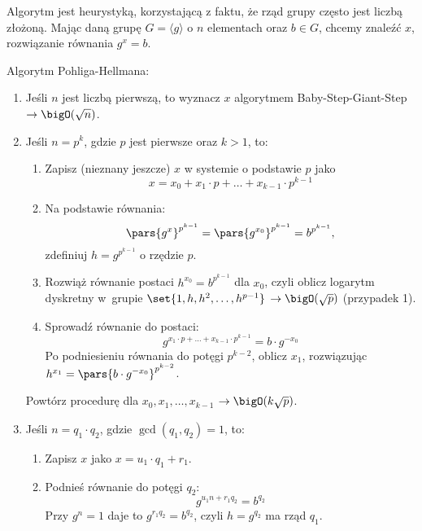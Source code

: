 Algorytm jest heurystyką, korzystającą z faktu, że rząd grupy często jest liczbą złożoną. Mając daną grupę \( G = \langle g \rangle \) o \( n \) elementach oraz \( b \in G \), chcemy znaleźć \( x \), rozwiązanie równania \( g^x = b \).
\begin{greyframe}
    Algorytm Pohliga-Hellmana:
    \begin{enumerate}
        \item Jeśli \( n \) jest liczbą pierwszą, to wyznacz \( x \) algorytmem Baby-Step-Giant-Step \\ \( \rightarrow \bigO(\sqrt{n}) \).
        \item Jeśli \( n = p^k \), gdzie \( p \) jest pierwsze oraz \( k > 1 \), to:
            \begin{enumerate}
                \item Zapisz (nieznany jeszcze) \( x \) w systemie o podstawie \( p \) jako 
                \[
                    x = x_0 + x_1 \cdot p + \ldots + x_{k-1} \cdot p^{k-1}
                \]
                \item Na podstawie równania:
                \[
                    \pars{g^x}^{p^{k-1}} = \pars{g^{x_0}}^{p^{k-1}} = b^{p^{k-1}},
                \]
                zdefiniuj \( h = g^{p^{k-1}} \) o rzędzie \( p \).
                \item Rozwiąż równanie postaci \( h^{x_0} = b^{p^{k-1}} \) dla \( x_0 \), czyli oblicz logarytm dyskretny w~grupie \( \set{1, h, h^2, \ldots, h^{p-1}} \) \( \rightarrow \bigO(\sqrt{p}) \) (przypadek 1).
                \item Sprowadź równanie do postaci: 
                \[
                    g^{x_1 \cdot p + \ldots + x_{k-1} \cdot p^{k-1}} = b \cdot g^{-x_0}
                \]
                Po podniesieniu równania do potęgi \( p^{k-2} \), oblicz \( x_1 \), rozwiązując \( h^{x_1} = \pars{b \cdot g^{-x_0}}^{p^{k-2}} \).
            \end{enumerate}
            Powtórz procedurę dla \( x_0, x_1, \ldots, x_{k-1} \) \( \rightarrow \bigO(k \sqrt{p}) \).
        \item Jeśli \( n  = q_1 \cdot q_2 \), gdzie \( \gcd(q_1, q_2) = 1 \), to:
        \begin{enumerate}
            \item Zapisz \( x \) jako \( x = u_1 \cdot q_1 + r_1 \).
            \item Podnieś równanie do potęgi \( q_2\):
            \[
                g^{u_1n + r_1q_2} = b^{q_2}
            \]
            Przy \( g^n = 1 \) daje to \( g^{r_1 q_2} = b^{q_2} \), czyli \( h = g^{q_2} \) ma rząd \( q_1 \).

\end{enumerate}
\end{enumerate}
\end{greyframe}
